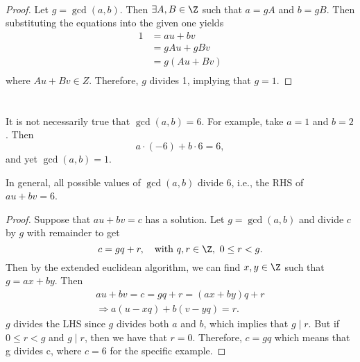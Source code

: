 \documentclass[
  coursecode={MTHE 418},
  assignmentname={Homework \homeworknumber},
  studentnumber=20053722,
  name={Bryan Hoang},
  draft,
  final,
]{
  ltxanswer%
}
\begin{document}
\begin{questions}
    \question\
    \begin{parts}
      \part{}
      \begin{solution}
        \begin{proof}
          Let \(g = \gcd(a,b)\). Then \(\exists A, B \in \Z\) such that \(a = gA\) and \(b = gB\). Then substituting the equations into the given one yields
          \begin{align*}
            1 &= au + bv    \\
              &= gAu + gBv  \\
              &= g(Au + Bv) \\
          \end{align*}
          where \(Au + Bv \in Z\). Therefore, \(g\) divides 1, implying that \(g = 1\).
        \end{proof}
      \end{solution}

      \part{}
      \begin{solution}
        It is not necessarily true that \(\gcd(a,b) = 6\). For example, take \(a = 1\) and \(b = 2\). Then
        \begin{equation*}
          a \cdot (-6) + b \cdot 6 = 6,
        \end{equation*}
        and yet \(\gcd(a,b) = 1\).

        \begin{claim}
          In general, all possible values of \(\gcd(a,b)\) divide 6, i.e., the RHS of \(au + bv = 6\).
        \end{claim}
        \begin{proof}
          Suppose that \(au + bv = c\) has a solution. Let \(g = \gcd(a,b)\) and divide \(c\) by \(g\) with remainder to get
          \begin{equation*}
            c = gq + r, \quad \text{with}\ q,r \in \Z,\ 0 \le r < g.
          \end{equation*}
          Then by the extended euclidean algorithm, we can find \(x,y \in \Z\) such that \(g = ax + by\). Then
          \begin{gather*}
            au + bv = c = gq + r = (ax + by)q + r \\
            \Rightarrow a(u - xq) + b(v - yq) = r.
          \end{gather*}
          \(g\) divides the LHS since \(g\) divides both \(a\) and \(b\), which implies that \(g \mid r\). But if \(0 \le r < g\) and \(g \mid r\), then we have that \(r = 0\). Therefore, \(c = gq\) which means that g divides c, where \(c = 6\) for the specific example.
        \end{proof}
      \end{solution}


\end{parts}
\end{questions}
\end{document}
